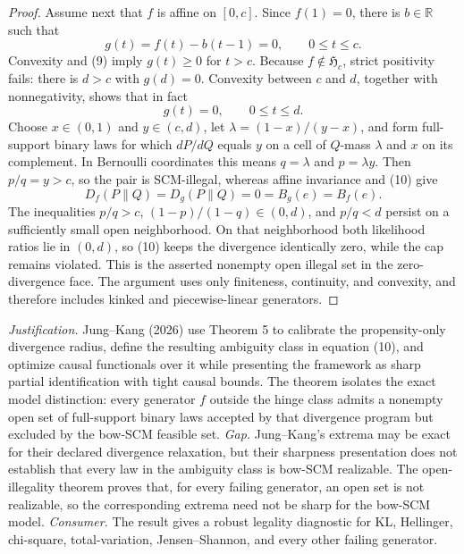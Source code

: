 \documentclass{article}
\begin{document}
\begin{proof}
Assume next that \(f\) is affine on \([0,c]\).  Since \(f(1)=0\), there is \(b\in\mathbb R\) such that
\[
 g(t)=f(t)-b(t-1)=0,\qquad 0\le t\le c. \tag{9}
\]
Convexity and (9) imply \(g(t)\ge0\) for \(t>c\).  Because \(f\notin\mathfrak H_c\), strict positivity fails: there is \(d>c\) with \(g(d)=0\).  Convexity between \(c\) and \(d\), together with nonnegativity, shows that in fact
\[
 g(t)=0,\qquad 0\le t\le d. \tag{10}
\]
Choose \(x\in(0,1)\) and \(y\in(c,d)\), let \(\lambda=(1-x)/(y-x)\), and form full-support binary laws for which \(dP/dQ\) equals \(y\) on a cell of \(Q\)-mass \(\lambda\) and \(x\) on its complement.  In Bernoulli coordinates this means \(q=\lambda\) and \(p=\lambda y\).  Then \(p/q=y>c\), so the pair is SCM-illegal, whereas affine invariance and (10) give
\[
 D_f(P\|Q)=D_g(P\|Q)=0=B_g(e)=B_f(e).
\]
The inequalities \(p/q>c\), \((1-p)/(1-q)\in(0,d)\), and \(p/q<d\) persist on a sufficiently small open neighborhood.  On that neighborhood both likelihood ratios lie in \((0,d)\), so (10) keeps the divergence identically zero, while the cap remains violated.  This is the asserted nonempty open illegal set in the zero-divergence face.  The argument uses only finiteness, continuity, and convexity, and therefore includes kinked and piecewise-linear generators.
\end{proof}
\par\smallskip\noindent \textit{Justification.} Jung--Kang (2026) use Theorem 5 to calibrate the propensity-only divergence radius, define the resulting ambiguity class in equation (10), and optimize causal functionals over it while presenting the framework as sharp partial identification with tight causal bounds. The theorem isolates the exact model distinction: every generator \(f\) outside the hinge class admits a nonempty open set of full-support binary laws accepted by that divergence program but excluded by the bow-SCM feasible set. \textit{Gap.} Jung--Kang's extrema may be exact for their declared divergence relaxation, but their sharpness presentation does not establish that every law in the ambiguity class is bow-SCM realizable. The open-illegality theorem proves that, for every failing generator, an open set is not realizable, so the corresponding extrema need not be sharp for the bow-SCM model. \textit{Consumer.} The result gives a robust legality diagnostic for KL, Hellinger, chi-square, total-variation, Jensen--Shannon, and every other failing generator.
\end{document}
